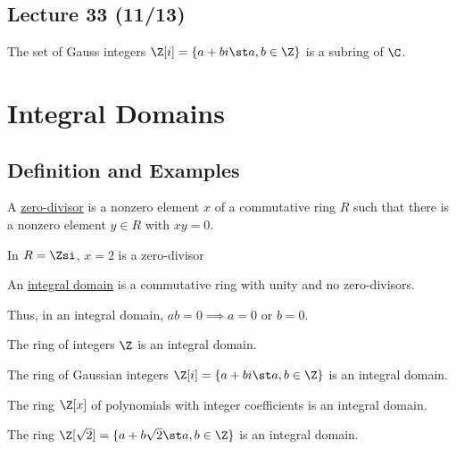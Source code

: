 \subsection*{Lecture 33 (11/13)} %

\begin{example}
  The set of Gauss integers \(\Z[i] = \{a+bi\st a,b\in\Z\}\) is a subring of \(\C\).
\end{example}

\section{Integral Domains}
\subsection{Definition and Examples}
\begin{definition}
  A \ul{zero-divisor} is a nonzero element \(x\) of a commutative ring \(R\) such that there is
  a nonzero element \(y\in R\) with \(xy=0\).
\end{definition}

\begin{example}
  In \(R = \Zsi\), \(x=2\) is a zero-divisor
\end{example}

\begin{definition}
  An \ul{integral domain} is a commutative ring with unity and no zero-divisors.
\end{definition}

Thus, in an integral domain, \(ab=0\implies a=0\) or \(b=0\).

\begin{example}
  The ring of integers \(\Z\) is an integral domain.
\end{example}

\begin{example}
  The ring of Gaussian integers \(\Z[i] = \{a+bi \st a,b\in\Z\}\) is an integral domain.
\end{example}

\begin{example}
  The ring \(\Z[x]\) of polynomials with integer coefficients is an integral domain.
\end{example}

\begin{example}
  The ring \(\Z[\sqrt{2}]=\{a+b\sqrt{2}\st a,b\in\Z\}\) is an integral domain.
\end{example}


